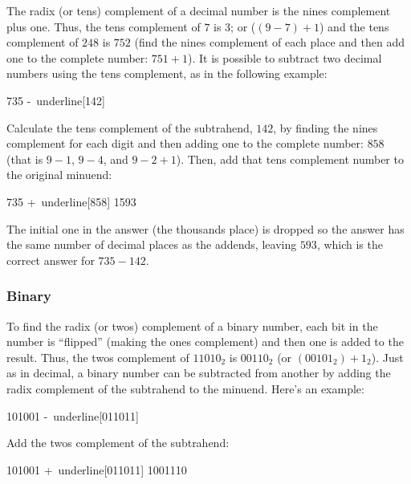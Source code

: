 The radix (or tens) complement of a decimal number is the nines complement plus one. Thus, the tens complement of $ 7 $ is $ 3 $; or ($ (9-7)+1 $) and the tens complement of $ 248 $ is $ 752 $ (find the nines complement of each place and then add one to the complete number: $ 751 + 1 $). It is possible to subtract two decimal numbers using the tens complement, as in the following example: 

\begin{binDisp}[commandchars=~\[\]]
     735
    -~underline[142]
\end{binDisp}

Calculate the tens complement of the subtrahend, $ 142 $, by finding the nines complement for each digit and then adding one to the complete number: $ 858 $ (that is $ 9-1 $, $ 9-4 $, and $ 9-2+1 $). Then, add that tens complement number to the original minuend: 

\begin{binDisp}[commandchars=~\[\]]
     735
    +~underline[858]
    1593
\end{binDisp}

The initial one in the answer (the thousands place) is dropped so the answer has the same number of decimal places as the addends, leaving $ 593 $, which is the correct answer for $ 735-142 $.

\subsubsection{Binary}
\label{MO:subsub:binary_subtraction_with_radix_complement}

To find the radix (or twos) complement of a binary number, each bit in the number is ``flipped'' (making the ones complement) and then one is added to the result. Thus, the twos complement of $ 11010_2 $ is $ 00110_2 $ (or $ (00101_2)+1_2 $). Just as in decimal, a binary number can be subtracted from another by adding the radix complement of the subtrahend to the minuend. Here's an example: 

\begin{binDisp}[commandchars=~\[\]]
     101001
    -~underline[011011]
\end{binDisp}

Add the twos complement of the subtrahend:

\begin{binDisp}[commandchars=~\[\]]
     101001
    +~underline[011011]
    1001110
\end{binDisp}

